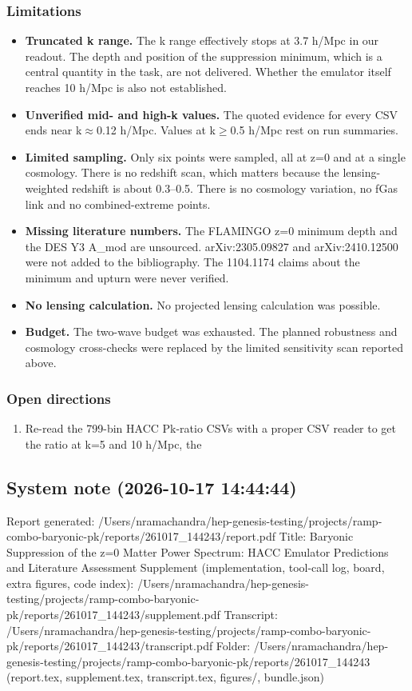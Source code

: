 \documentclass[11pt,a4paper]{article}
\begin{document}
\subsubsection*{Limitations}
\begin{itemize}
  \item \textbf{Truncated k range.} The k range effectively stops at 3.7 h/Mpc in our readout. The depth and position of the suppression minimum, which is a central quantity in the task, are not delivered. Whether the emulator itself reaches 10 h/Mpc is also not established.
  \item \textbf{Unverified mid- and high-k values.} The quoted evidence for every CSV ends near k$\approx$0.12 h/Mpc. Values at k$\geq$0.5 h/Mpc rest on run summaries.
  \item \textbf{Limited sampling.} Only six points were sampled, all at z=0 and at a single cosmology. There is no redshift scan, which matters because the lensing-weighted redshift is about 0.3--0.5. There is no cosmology variation, no fGas link and no combined-extreme points.
  \item \textbf{Missing literature numbers.} The FLAMINGO z=0 minimum depth and the DES Y3 A\_mod are unsourced. arXiv:2305.09827 and arXiv:2410.12500 were not added to the bibliography. The 1104.1174 claims about the minimum and upturn were never verified.
  \item \textbf{No lensing calculation.} No projected lensing calculation was possible.
  \item \textbf{Budget.} The two-wave budget was exhausted. The planned robustness and cosmology cross-checks were replaced by the limited sensitivity scan reported above.
\end{itemize}
\subsubsection*{Open directions}
\begin{enumerate}
  \item Re-read the 799-bin HACC Pk-ratio CSVs with a proper CSV reader to get the ratio at k=5 and 10 h/Mpc, the
\end{enumerate}
\subsection*{System note \small(2026-10-17 14:44:44)}
Report generated: /Users/nramachandra/hep-genesis-testing/projects/ramp-combo-baryonic-pk/reports/261017\_144243/report.pdf Title: Baryonic Suppression of the z=0 Matter Power Spectrum: HACC Emulator Predictions and Literature Assessment Supplement (implementation, tool-call log, board, extra figures, code index): /Users/nramachandra/hep-genesis-testing/projects/ramp-combo-baryonic-pk/reports/261017\_144243/supplement.pdf Transcript: /Users/nramachandra/hep-genesis-testing/projects/ramp-combo-baryonic-pk/reports/261017\_144243/transcript.pdf Folder: /Users/nramachandra/hep-genesis-testing/projects/ramp-combo-baryonic-pk/reports/261017\_144243 (report.tex, supplement.tex, transcript.tex, figures/, bundle.json)
\end{document}
